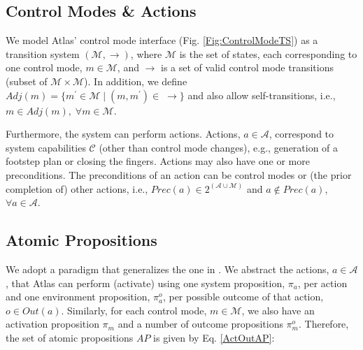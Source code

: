 
\subsection{Control Modes \& Actions}\label{S:CMActions}

We model Atlas' control mode interface (Fig. \ref{Fig:ControlModeTS}) as a transition system $(\mathcal{M}, \boldsymbol\rightarrow)$, where $\mathcal{M}$ is the set of states, each corresponding to one control mode, $m \in \mathcal{M}$, and $\boldsymbol\rightarrow$ is a set of valid control mode transitions (subset of $\mathcal{M} \times \mathcal{M}$).
In addition, we define $Adj(m) = \{ m^\prime \in \mathcal{M} \; | \; (m, m^\prime) \in \; \boldsymbol\rightarrow \}$ and also allow self-transitions, i.e., $m \in Adj(m), \; \forall m \in \mathcal{M}$.

Furthermore, the system can perform actions. Actions, $a \in \mathcal{A}$, correspond to system capabilities $\mathcal{C}$ (other than control mode changes), e.g., generation of a footstep plan or closing the fingers.
Actions may also have one or more preconditions.
The preconditions of an action can be control modes or (the prior completion of) other actions, i.e., $Prec(a) \in 2^{(\mathcal{A} \cup \mathcal{M})}$ and $a \not \in Prec(a)$, $\forall a \in \mathcal{A}$.

\subsection{Atomic Propositions}\label{S:AP}

We adopt a paradigm that generalizes the one in \cite{Vasu2013ICRA}.
We abstract the actions, $a \in \mathcal{A}$, that Atlas can perform (activate) using one system proposition, $\pi_a$, per action and one environment proposition, $\pi_a^o$, per possible outcome of that action, $o \in Out(a)$.
Similarly,
for each control mode, $m \in \mathcal{M}$, we also have an activation proposition $\pi_m$ and a number of outcome propositions $\pi_m^o$.
Therefore, the set of atomic propositions $AP$ is given by Eq. \eqref{ActOutAP}:

